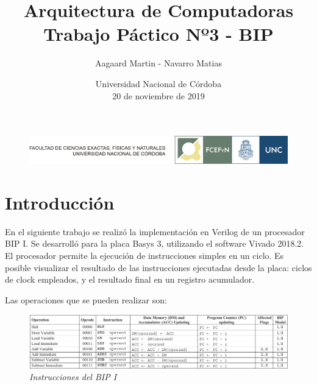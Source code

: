 \documentclass[12pt,A4paper,titlepage]{article}
\begin{document}
\renewcommand{\tablename}{Tabla}
\large

\title{Arquitectura de Computadoras \\
\large Trabajo Páctico Nº3 - BIP}
\author{Aagaard Martin - Navarro Matias
\bigskip
\bigskip}

\date{Universidad Nacional de Córdoba \\ 20 de noviembre de 2019}

\begin{titlepage}
\center


\begin{figure}[h]
    \centering
    \includegraphics[scale=0.8]{figure/logos-fcefyn-y-unc.png}
    \label{fig:unc-logo}
\end{figure}

{\let\newpage\relax\maketitle}
\center
\end{titlepage}

\maketitle %
\tableofcontents %
\newpage

\section{Introducción}
En el siguiente trabajo se realizó la implementación en Verilog de un procesador BIP I. Se desarrolló para la placa Basys 3, utilizando el software Vivado 2018.2. El procesador permite la ejecución de instrucciones simples en un ciclo. Es posible visualizar el resultado de las instrucciones ejecutadas desde la placa: ciclos de clock empleados, y el resultado final en un registro acumulador.

Las operaciones que se pueden realizar son:

\begin{figure} [H]
    \centering
    \includegraphics[width=\textwidth]{figure/BIP-instruc.png}
    \caption{\textit{Instrucciones del BIP I}}
    \label{fig:BIP-instruc}
\end{figure}
\end{document}
